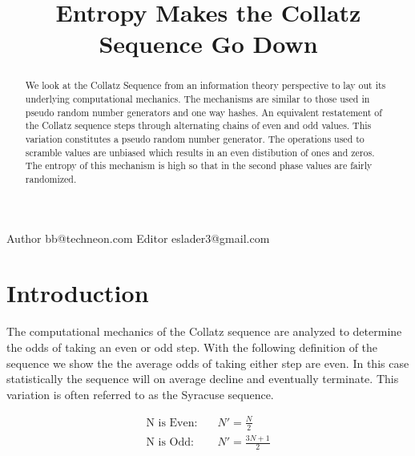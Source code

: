 \documentclass[preprint]{sigplanconf}
\begin{document}


\title{Entropy Makes the Collatz Sequence Go Down}

{Author}
{bb@techneon.com}
{Editor}
{eslader3@gmail.com}

\maketitle




\begin{abstract}
    We look at the Collatz Sequence from an information theory perspective to lay out its underlying computational mechanics. The mechanisms are similar to those used in pseudo random number generators and one way hashes.
    An equivalent restatement of the Collatz sequence steps through alternating chains of even and odd values.  This variation constitutes a pseudo random number generator.  The operations used to scramble values are unbiased which results in an even distibution of ones and zeros.  The entropy of this mechanism is high so that in the second phase values are fairly randomized.
\end{abstract}

\section{Introduction}


The computational mechanics of the Collatz sequence are analyzed to determine the odds of taking an even or odd step. With the following definition of the sequence we show the the average odds of taking either step are even. In this case statistically the sequence will on average decline and eventually terminate. This variation is often referred to as the Syracuse sequence.

\begin{align*}
    \text{N is Even:} & \quad N' = \frac{N}{2}      \\
    \text{N is Odd:}  & \quad N' = \frac{3N + 1}{2}
\end{align*}
\end{document}
